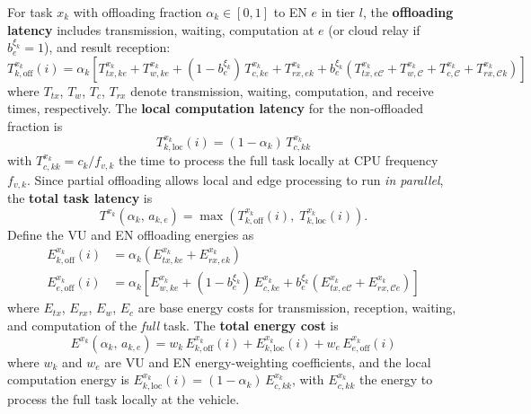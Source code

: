 \documentclass[11pt,a4paper]{article}
\theoremstyle{definition}
\begin{document}
For task $x_k$ with offloading fraction $\alpha_k \in [0,1]$ to EN $e$ in tier $l$, the \textbf{offloading latency} includes transmission, waiting, computation at $e$ (or cloud relay if $b_e^{\xi_k}=1$), and result reception:
\begin{equation}
  T_{k,\mathrm{off}}^{x_k}(i) = \alpha_k\!\left[T_{tx,ke}^{x_k} + T_{w,ke}^{x_k}
    + (1-b_e^{\xi_k})\,T_{c,ke}^{x_k} + T_{rx,ek}^{x_k}
    + b_e^{\xi_k}\!\left(T_{tx,e\mathcal{C}}^{x_k}
    + T_{w,\mathcal{C}}^{x_k} + T_{c,\mathcal{C}}^{x_k}
    + T_{rx,\mathcal{C}k}^{x_k}\right)\right]
  \label{eq:T_off}
\end{equation}
where $T_{tx}$, $T_w$, $T_c$, $T_{rx}$ denote transmission, waiting, computation, and receive times, respectively. The \textbf{local computation latency} for the non-offloaded fraction is
\begin{equation}
  T_{k,\mathrm{loc}}^{x_k}(i) = (1-\alpha_k)\,T_{c,kk}^{x_k}
  \label{eq:T_loc}
\end{equation}
with $T_{c,kk}^{x_k} = c_k / f_{v,k}$ the time to process the full task locally at CPU frequency $f_{v,k}$. Since partial offloading allows local and edge processing to run \emph{in parallel}, the \textbf{total task latency} is
\begin{equation}
  T^{x_k}\!\left(\alpha_k,\, a_{k,e}\right)
  = \max\!\left(T_{k,\mathrm{off}}^{x_k}(i),\; T_{k,\mathrm{loc}}^{x_k}(i)\right).
  \label{eq:latency}
\end{equation}
Define the VU and EN offloading energies as
\begin{align}
  E_{k,\mathrm{off}}^{x_k}(i) &= \alpha_k\!\left(E_{tx,ke}^{x_k} + E_{rx,ek}^{x_k}\right)
  \label{eq:E_koff}\\
  E_{e,\mathrm{off}}^{x_k}(i) &= \alpha_k\!\left[E_{w,ke}^{x_k}
    + (1-b_e^{\xi_k})\,E_{c,ke}^{x_k}
    + b_e^{\xi_k}\!\left(E_{tx,e\mathcal{C}}^{x_k}
    + E_{rx,\mathcal{C}e}^{x_k}\right)\right]
  \label{eq:E_eoff}
\end{align}
where $E_{tx}$, $E_{rx}$, $E_w$, $E_c$ are base energy costs for transmission, reception, waiting, and computation of the \emph{full} task. The \textbf{total energy cost} is~\cite{hrl_ntn}
\begin{equation}
  E^{x_k}\!\left(\alpha_k,\, a_{k,e}\right)
  = w_k\,E_{k,\mathrm{off}}^{x_k}(i)
  + E_{k,\mathrm{loc}}^{x_k}(i)
  + w_e\,E_{e,\mathrm{off}}^{x_k}(i)
  \label{eq:energy}
\end{equation}
where $w_k$ and $w_e$ are VU and EN energy-weighting coefficients, and the local computation energy is $E_{k,\mathrm{loc}}^{x_k}(i) = (1-\alpha_k)\,E_{c,kk}^{x_k}$, with $E_{c,kk}^{x_k}$ the energy to process the full task locally at the vehicle.
\end{document}
